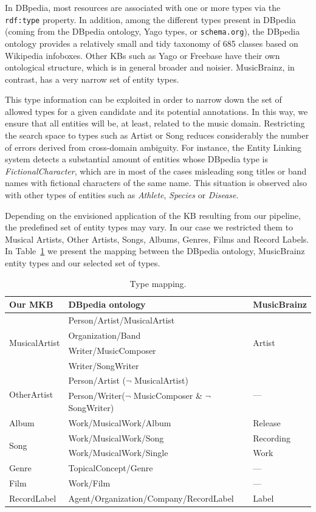 In DBpedia, most resources are associated with one or more types via the \texttt{rdf:type} property. In addition, among the different types present in DBpedia (coming from the DBpedia ontology, Yago types, or \texttt{schema.org}), the DBpedia ontology provides a relatively small and tidy taxonomy of 685 classes based on Wikipedia infoboxes. Other KBs such as Yago or Freebase have their own ontological structure, which is in general broader and noisier. MusicBrainz, in contrast, has a very narrow set of entity types. 

This type information can be exploited in order to narrow down the set of allowed types for a given candidate and its potential annotations. In this way, we ensure that all entities will be, at least, related to the music domain. Restricting the search space to types such as Artist or Song reduces considerably the number of errors derived from cross-domain ambiguity. For instance, the Entity Linking system detects a substantial amount of entities whose DBpedia type is \textit{FictionalCharacter}, which are in most of the cases misleading song titles or band names with fictional characters of the same name. This situation is observed also with other types of entities such as \textit{Athlete}, \textit{Species} or \textit{Disease}.

Depending on the envisioned application of the KB resulting from our pipeline, the predefined set of entity types may vary. In our case we restricted them to Musical Artists, Other Artists, Songs, Albums, Genres, Films and Record Labels. In Table~\ref{tbl:kb:type_mapping} we present the mapping between the DBpedia ontology, MusicBrainz entity types and our selected set of types.

\begin{table}[]
\scriptsize
\centering
	\begin{tabular}{ l l l }
	\hline
\textbf{Our MKB} & \textbf{DBpedia ontology} & \textbf{MusicBrainz} \\
	\hline
\multirow{4}{*}{MusicalArtist} & Person/Artist/MusicalArtist & \multirow{4}{*}{Artist}\\ 
& Organization/Band & \\ 
& Writer/MusicComposer & \\ 
& Writer/SongWriter & \\
	\hline
\multirow{2}{*}{OtherArtist} & Person/Artist ($\neg$ MusicalArtist) & \multirow{2}{*}{---} \\
& Person/Writer($\neg$ MusicComposer \& $\neg$ SongWriter) & \\
    \hline
Album & Work/MusicalWork/Album & Release \\
    \hline
\multirow{2}{*}{Song} & Work/MusicalWork/Song & Recording \\
& Work/MusicalWork/Single & Work \\
    \hline
Genre & TopicalConcept/Genre & --- \\
    \hline
Film & Work/Film & --- \\
    \hline
RecordLabel & Agent/Organization/Company/RecordLabel & Label \\
    \hline
	\end{tabular}
	\caption{Type mapping.}
	\label{tbl:kb:type_mapping}
\end{table}
%

